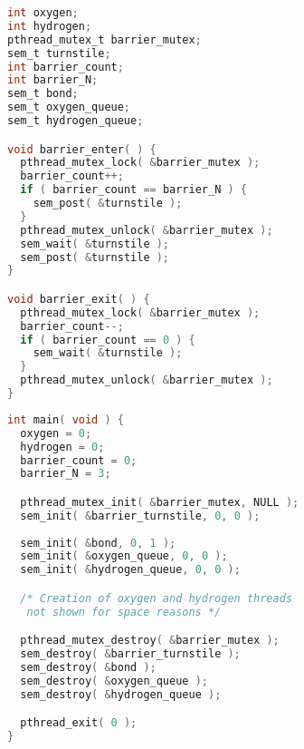 \begin{multicols}{2}
	\begin{lstlisting}[firstline=0, language=C]
int oxygen;
int hydrogen;
pthread_mutex_t barrier_mutex;
sem_t turnstile;
int barrier_count;
int barrier_N;
sem_t bond;
sem_t oxygen_queue;
sem_t hydrogen_queue;

void barrier_enter( ) {
  pthread_mutex_lock( &barrier_mutex );
  barrier_count++;
  if ( barrier_count == barrier_N ) {
    sem_post( &turnstile );
  }
  pthread_mutex_unlock( &barrier_mutex );
  sem_wait( &turnstile );
  sem_post( &turnstile );            
}

void barrier_exit( ) {
  pthread_mutex_lock( &barrier_mutex );
  barrier_count--;
  if ( barrier_count == 0 ) {
    sem_wait( &turnstile );
  }
  pthread_mutex_unlock( &barrier_mutex );
}


\end{lstlisting}
	\columnbreak
	\begin{lstlisting}[language=C]
int main( void ) {
  oxygen = 0;
  hydrogen = 0;
  barrier_count = 0;
  barrier_N = 3;

  pthread_mutex_init( &barrier_mutex, NULL );
  sem_init( &barrier_turnstile, 0, 0 );
  
  sem_init( &bond, 0, 1 );
  sem_init( &oxygen_queue, 0, 0 );
  sem_init( &hydrogen_queue, 0, 0 ); 

  /* Creation of oxygen and hydrogen threads
   not shown for space reasons */

  pthread_mutex_destroy( &barrier_mutex );
  sem_destroy( &barrier_turnstile );
  sem_destroy( &bond );
  sem_destroy( &oxygen_queue );
  sem_destroy( &hydrogen_queue );   

  pthread_exit( 0 );
}

\end{lstlisting}
\end{multicols}

